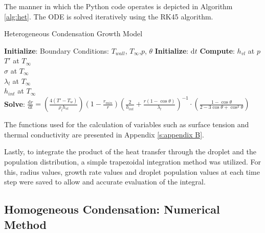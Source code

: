 \documentclass[12pt]{article}
\numberwithin{equation}{section}
\begin{document}
The manner in which the Python code operates is depicted in Algorithm \ref{alg:het}. The ODE is solved iteratively using the RK45 algorithm. 
\begin{algorithm}[H]
    \caption{Heterogeneous Condensation Growth Model}
    \label{alg:het}
    \begin{algorithmic}[1]
    \State \textbf{Initialize}: Boundary Conditions: $T_{wall}$, $T_{\infty}$,$p$, $\theta$  
    \State \textbf{Initialize}: $\mathrm{d}t$ 
    \State \textbf{Compute}: $h_{vl}$ at $p$\\ 
    \quad \quad \quad \quad \quad$T'$ at $T_{\infty}$ \\
    \quad \quad \quad \quad \quad$\sigma$ at $T_{\infty}$ \\
    \quad \quad \quad \quad \quad$\lambda_{l}$ at $T_{\infty}$ \\
    \quad \quad \quad \quad \quad$h_{int}$ at $T_{\infty}$ \\
    \State \textbf{Solve}: $\frac{\mathrm{d}r}{\mathrm{d}t}= \left(\frac{4(T'-T_{w})}{\rho_{l}h_{vl}}\right)(1-\frac{r_{min}}{r})\left(\frac{2}{h_{int}}+\frac{r(1-\cos\theta)}{\lambda_{l}}\right)^{-1}  \cdot\left(\frac{1-\cos\theta}{2-3\cos\theta+\cos^{3}\theta}\right)$ 
    \end{algorithmic}
\end{algorithm}
\noindent
The functions used for the calculation of variables such as surface tension and thermal conductivity are presented in Appendix \ref{s:appendix B}.

Lastly, to integrate the product of the heat transfer through the droplet and the population distribution, a simple trapezoidal integration method was utilized. For this, radius values, growth rate values and droplet population values at each time step were saved to allow and accurate evaluation of the integral. 

\subsection{Homogeneous Condensation: Numerical Method}\label{ss:Methodology-Homogeneous}
\end{document}

